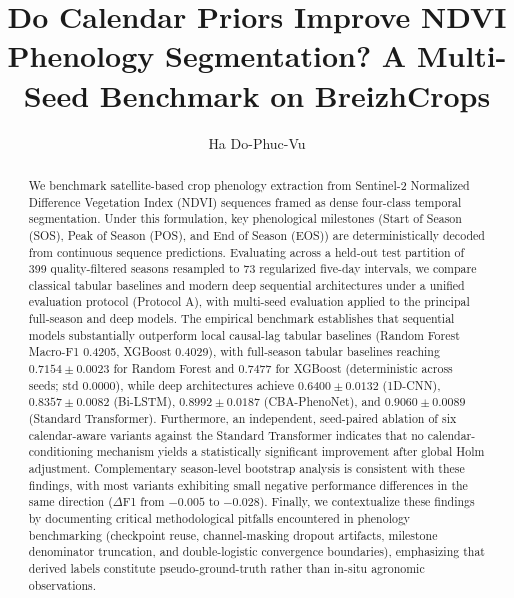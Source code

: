 \documentclass[runningheads]{llncs}
\begin{document}
\title{Do Calendar Priors Improve NDVI Phenology Segmentation? A Multi-Seed Benchmark on BreizhCrops}
\author{Ha Do-Phuc-Vu}

\maketitle

\begin{abstract}
We benchmark satellite-based crop phenology extraction from Sentinel-2 Normalized Difference Vegetation Index (NDVI) sequences framed as dense four-class temporal segmentation. Under this formulation, key phenological milestones (Start of Season (SOS), Peak of Season (POS), and End of Season (EOS)) are deterministically decoded from continuous sequence predictions. Evaluating across a held-out test partition of 399 quality-filtered seasons resampled to 73 regularized five-day intervals, we compare classical tabular baselines and modern deep sequential architectures under a unified evaluation protocol (Protocol A), with multi-seed evaluation applied to the principal full-season and deep models. The empirical benchmark establishes that sequential models substantially outperform local causal-lag tabular baselines (Random Forest Macro-F1 0.4205, XGBoost 0.4029), with full-season tabular baselines reaching $0.7154 \pm 0.0023$ for Random Forest and $0.7477$ for XGBoost (deterministic across seeds; std 0.0000), while deep architectures achieve $0.6400 \pm 0.0132$ (1D-CNN), $0.8357 \pm 0.0082$ (Bi-LSTM), $0.8992 \pm 0.0187$ (CBA-PhenoNet), and $0.9060 \pm 0.0089$ (Standard Transformer). Furthermore, an independent, seed-paired ablation of six calendar-aware variants against the Standard Transformer indicates that no calendar-conditioning mechanism yields a statistically significant improvement after global Holm adjustment. Complementary season-level bootstrap analysis is consistent with these findings, with most variants exhibiting small negative performance differences in the same direction ($\Delta$F1 from $-0.005$ to $-0.028$). Finally, we contextualize these findings by documenting critical methodological pitfalls encountered in phenology benchmarking (checkpoint reuse, channel-masking dropout artifacts, milestone denominator truncation, and double-logistic convergence boundaries), emphasizing that derived labels constitute pseudo-ground-truth rather than in-situ agronomic observations.
\end{abstract}
\end{document}
